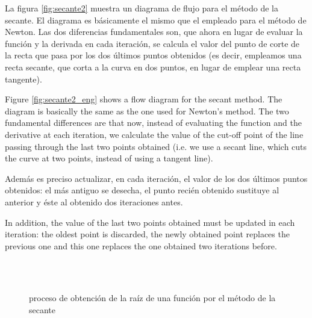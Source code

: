 \begin{paracol}{2}

La figura \ref{fig:secante2} muestra un diagrama de flujo para el método de la secante. El diagrama es básicamente el mismo que el empleado para el método de Newton. Las dos diferencias fundamentales son, que ahora en lugar de evaluar la función y la derivada en cada iteración, se calcula  el valor del punto de corte de la recta que pasa por los dos últimos puntos obtenidos (es decir, empleamos una recta secante, que corta a la curva en dos puntos, en lugar de emplear una recta tangente). 

\switchcolumn
Figure \ref{fig:secante2_eng} shows a flow diagram for the secant method. The diagram is basically the same as the one used for Newton's method. The two fundamental differences are that now, instead of evaluating the function and the derivative at each iteration, we calculate the value of the cut-off point of the line passing through the last two points obtained (i.e. we use a secant line, which cuts the curve at two points, instead of using a tangent line). 

\switchcolumn

Además es preciso actualizar, en cada iteración, el valor de los dos últimos puntos obtenidos: el más antiguo se desecha, el punto recién obtenido sustituye al anterior y éste al obtenido dos iteraciones antes. 

\switchcolumn

In addition, the value of the last two points obtained must be updated in each iteration: the oldest point is discarded, the newly obtained point replaces the previous one and this one replaces the one obtained two iterations before. 


\end{paracol}

\begin{figure}
\centering
{} \qquad
{}\\
\qquad
{}\\
\qquad
{}

\caption{proceso de obtención de la raíz de una función por el método de la secante}
\label{fig:secante3}
\end{figure}

